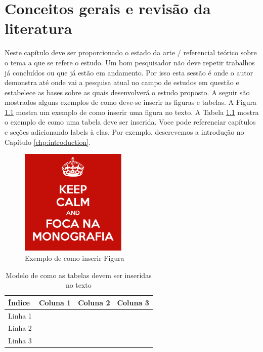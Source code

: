 \chapter{Conceitos gerais e revisão da literatura}
Neste capítulo deve ser proporcionado o estado da arte / referencial teórico
sobre o tema a que se refere o estudo. Um bom pesquisador não deve repetir
trabalhos já concluídos ou que já estão em andamento. Por isso esta sessão é
onde o autor demonstra até onde vai a pesquisa atual no campo de estudos em
questão e estabelece as bases sobre as quais desenvolverá o estudo proposto. A
seguir são mostrados alguns exemplos de como deve-se inserir as figuras e
tabelas. A Figura \ref{fig:exemplo} mostra um exemplo de como inserir uma
figura no texto. A Tabela \ref{tb:exemplo} mostra o exemplo de como uma tabela
deve ser inserida.  Voce pode referenciar capítulos e seções adicionando labels
à elas. Por exemplo, descrevemos a introdução no Capítulo
\ref{chp:introduction}.

\begin{figure}[htb]
    \centering
    \includegraphics[width=0.45\textwidth]{images/figura.png}
    \caption{Exemplo de como inserir Figura}
    \label{fig:exemplo}
\end{figure}

\begin{table}[htb]
\caption{Modelo de como as tabelas devem ser inseridas no texto}
\label{tb:exemplo}
\centering
\begin{tabular}{|l|c|r|r|} %
\hline
Índice  & Coluna 1 & Coluna 2 & Coluna 3 \\
\hline
Linha 1 &          &          &          \\
Linha 2 &          &          &          \\
Linha 3 &          &          &          \\
\hline
\end{tabular}
\end{table}
